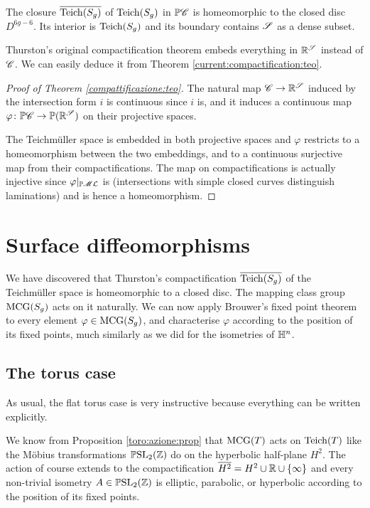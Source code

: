 \begin{teo} \label{current:compactification:teo}
The closure $\overline{{\rm Teich}(S_g)}$ of ${\rm Teich}(S_g)$ in $\mathbb{P}\mathscr{C}$ is homeomorphic to the closed disc $D^{6g-6}$. Its interior is ${\rm Teich}(S_g)$ and its boundary contains $\mathscr{S}$ as a dense subset.
\end{teo}

Thurston's original compactification theorem embeds everything in $\mathbb{R}^\mathscr{S}$ instead of $\mathscr{C}$. We can easily deduce it from Theorem \ref{current:compactification:teo}.

\begin{proof}[Proof of Theorem \ref{compattificazione:teo}]
The natural map $\mathscr{C} \to \mathbb{R}^\mathscr{S}$ induced by the intersection form $i$ is continuous since $i$ is, and it induces a continuous map $\varphi\colon\mathbb{P}\mathscr{C} \to \mathbb{P}(\mathbb{R}^\mathscr{S})$ on their projective spaces. 

The Teichm\"uller space is embedded in both projective spaces and $\varphi$ restricts to a homeomorphism between the two embeddings, and to a continuous surjective map from their compactifications. The map on compactifications is actually injective since $\varphi|_{\mathbb{P}\mathscr{M}\mathcal{L}}$ is (intersections with simple closed curves distinguish laminations) and is hence a homeomorphism.
\end{proof}


\section{Surface diffeomorphisms} \label{surface:diffeomorphisms:section}
We have discovered that Thurston's compactification $\overline{{\rm Teich}(S_g)}$ of the Teichm\"uller space is homeomorphic to a closed disc. The mapping class group ${\rm MCG}(S_g)$ acts on it naturally. We can now apply Brouwer's fixed point theorem to every element $\varphi \in {\rm MCG}(S_g)$, and characterise $\varphi$ according to the position of its fixed points, much similarly as we did for the isometries of $\mathbb{H}^n$.

\subsection{The torus case}
As usual, the flat torus case is very instructive because everything can be written explicitly. 

We know from Proposition \ref{toro:azione:prop} that ${\rm MCG}(T)$ acts on ${\rm Teich}(T)$ like the M\"obius transformations $\mathbb{P}{\rm SL}_2(\mathbb{Z})$ do on the hyperbolic half-plane $H^2$. The action of course extends to the compactification $\overline{H^2} = H^2\cup \mathbb{R}\cup\{\infty\}$ and every non-trivial isometry $A \in\mathbb{P}{\rm SL}_2(\mathbb{Z})$ is elliptic, parabolic, or hyperbolic according to the position of its fixed points.

